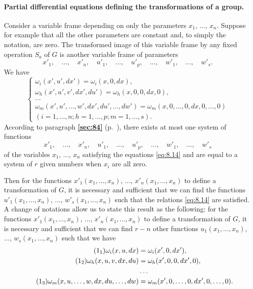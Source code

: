 \documentclass[leqno,11pt]{book}
\numberwithin{equation}{chapter}
\theoremstyle{shape1}
\theoremstyle{shapesmall}
\newcommand{\fsref}[1]{{\rm\textsection\textbf{\ref{sec:#1}}}}
\begin{document}
\paragraph{Partial differential equations defining the transformations of a group.}
\label{sec:113}
Consider a variable frame depending on only the parameters $x_{1}$, $\dots$, $x_{n}$. Suppose for example that all the other parameters are constant and, to simply the notation, are zero. The transformed image of this variable frame by any fixed operation $S_{a}$ of $G$ is another variable frame of parameters
\[
x'_{1},\quad\dots,\quad x'_{n},\quad u'_{1},\quad\dots,\quad u'_{p},\quad\dots,\quad w'_{1},\quad\dots,\quad w'_{s}.
\]
We have
\begin{equation}
  \label{eq:8.14}
  \left\{
    \begin{gathered}
      \omega_{i}(x',u',dx')=\omega_{i}(x,0,dx),\\
      \omega_{h}(x',u',v',dx',du')=\omega_{h}(x,0,0,dx,0),\\
      \dots\\
      \omega_{m}(x',u',\dots,w',dx',du',\dots,dw')=\omega_{m}(x,0,\dots,0,dx,0,\dots,0)\\
      (i=1,\dots,n;h=1,\dots,p;m=1,\dots,s).
    \end{gathered}
  \right.
\end{equation}
According to paragraph \fsref{84} (p.~\pageref{sec:84}), there exists at most one system of functions
\[
x'_{1},\quad\dots,\quad x'_{n},\quad u'_{1},\quad\dots,\quad u'_{p},\quad\dots,\quad w'_{1},\quad\dots,\quad w'_{s}
\]
of the variables $x_{1}$, $\dots$, $x_{n}$ satisfying the equations \eqref{eq:8.14} and are equal to a system of $r$ given numbers when $x_{i}$ are all zero.

Then for the functions $x'_{1}(x_{1},\dots,x_{n})$, $\dots$, $x'_{n}(x_{1},\dots,x_{n})$ to define a transformation of $G$, it is necessary and sufficient that we can find the functions $u'_{1}(x_{1},\dots,x_{n})$, $\dots$, $w'_{s}(x_{1},\dots,x_{n})$ such that the relations \eqref{eq:8.14} are satisfied. A change of notations allow us to state this result as the following: for the functions $x'_{1}(x_{1},\dots,x_{n})$, $\dots$, $x'_{n}(x_{1},\dots,x_{n})$ to define a transformation of $G$, it is necessary and sufficient that we can find $r-n$ other functions $u_{1}(x_{1},\dots,x_{n})$, $\dots$, $w_{s}(x_{1},\dots,x_{n})$ such that we have
\begin{align}\addtocounter{equation}{1}
  \label{eq:8.15-1}\tag{\arabic{equation}$_{1}$}
  \omega_{i}(x,u,dx)&=\omega_{i}(x',0,dx'),\\
  \label{eq:8.15-2}\tag{\arabic{equation}$_{2}$}
  \omega_{h}(x,u,v,dx,du)&=\omega_{h}(x',0,0,dx',0),\\
  \notag&\dots\\
  \label{eq:8.15-3}\tag{\arabic{equation}$_{3}$}
  \omega_{m}(x,u,\dots,w,dx,du,\dots,dw)&=\omega_{m}(x',0,\dots,0,dx',0,\dots,0).
\end{align}
\end{document}
